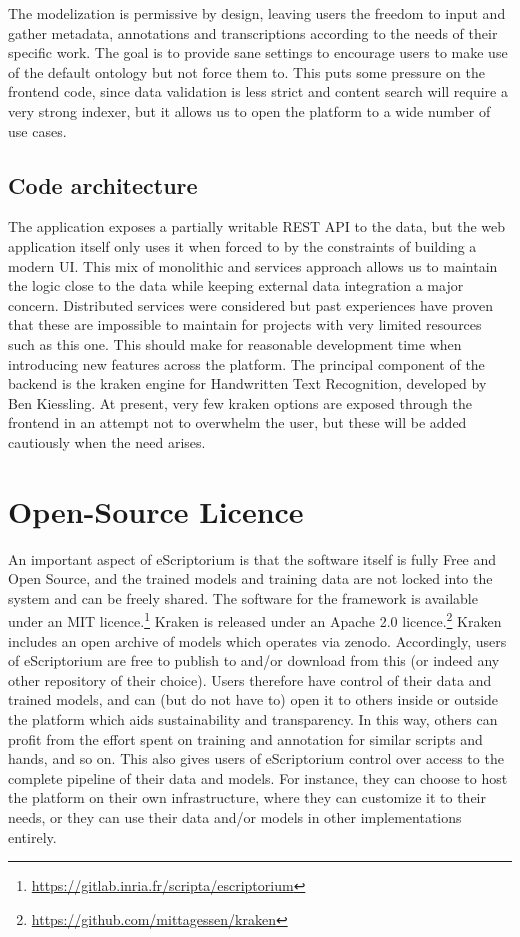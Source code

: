 The modelization is permissive by design, leaving users the freedom to input
and gather metadata, annotations and transcriptions according to the needs of
their specific work.  The goal is to provide sane settings to encourage users
to make use of the default ontology but not force them to. This puts some
pressure on the frontend code, since data validation is less strict and content
search will require a very strong indexer, but it allows us to open the
platform to a wide number of use cases.

\subsection{Code architecture}

The application exposes a partially writable REST API to the data, but the web
application itself only uses it when forced to by the constraints of building a
modern UI. This mix of monolithic and services approach allows us to maintain
the logic close to the data while keeping external data integration a major
concern. Distributed services were considered but past experiences have proven
that these are impossible to maintain for projects with very limited resources
such as this one. This should make for reasonable development time when
introducing new features across the platform. The principal component of the
backend is the kraken engine for Handwritten Text Recognition, developed by Ben
Kiessling. At present, very few kraken options are exposed through the frontend
in an attempt not to overwhelm the user, but these will be added cautiously
when the need arises.

\section{Open-Source Licence}

An important aspect of eScriptorium is that the software itself is fully Free
and Open Source, and the trained models and training data are not locked into
the system and can be freely shared. The software for the framework is
available under an MIT
licence.\footnote{\url{https://gitlab.inria.fr/scripta/escriptorium}} Kraken is
released under an Apache 2.0
licence.\footnote{\url{https://github.com/mittagessen/kraken}} Kraken includes
an open archive of models which operates via zenodo. Accordingly, users of
eScriptorium are free to publish to and/or download from this (or indeed any
other repository of their choice). Users therefore have control of their data
and trained models, and can (but do not have to) open it to others inside or
outside the platform which aids sustainability and transparency. In this way,
others can profit from the effort spent on training and annotation for similar
scripts and hands, and so on. This also gives users of eScriptorium control
over access to the complete pipeline of their data and models. For instance,
they can choose to host the platform on their own infrastructure, where they
can customize it to their needs, or they can use their data and/or models in
other implementations entirely.

